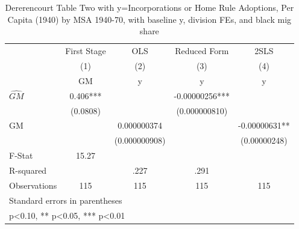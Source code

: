 \begin{table}[htbp]\centering
\def\sym#1{\ifmmode^{#1}\else\(^{#1}\)\fi}
\caption{Dererencourt Table Two with y=Incorporations or Home Rule Adoptions, Per Capita (1940) by MSA 1940-70, with baseline y, division FEs, and black mig share}
\begin{tabular}{l*{4}{c}}
\toprule
                    & First Stage   &         OLS   &Reduced Form   &        2SLS   \\
                    &\multicolumn{1}{c}{(1)}&\multicolumn{1}{c}{(2)}&\multicolumn{1}{c}{(3)}&\multicolumn{1}{c}{(4)}\\
                    &\multicolumn{1}{c}{GM}&\multicolumn{1}{c}{y}&\multicolumn{1}{c}{y}&\multicolumn{1}{c}{y}\\
\midrule
$\hat{GM}$          &       0.406***&               & -0.00000256***&               \\
                    &    (0.0808)   &               &(0.000000810)   &               \\
\addlinespace
GM                  &               & 0.000000374   &               & -0.00000631** \\
                    &               &(0.000000908)   &               &(0.00000248)   \\
\midrule
F-Stat              &       15.27   &               &               &               \\
R-squared           &               &        .227   &        .291   &               \\
Observations        &         115   &         115   &         115   &         115   \\
\bottomrule
\multicolumn{5}{l}{\footnotesize Standard errors in parentheses}\\
\multicolumn{5}{l}{\footnotesize * p<0.10, ** p<0.05, *** p<0.01}\\
\end{tabular}
\end{table}
